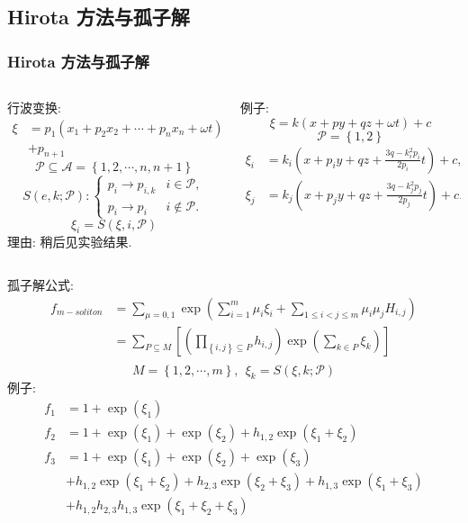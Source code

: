 \documentclass{beamer}
\newcommand{\sbrace}[1]{\left(#1\right)}
\newcommand{\mbrace}[1]{\left[#1\right]}
\newcommand{\bbrace}[1]{\left\{#1\right\}}
\newcommand{\ALLP}{\mathcal{A}}
\newcommand{\PS}{\mathcal{P}}
\begin{document}
\subsection{Hirota 方法与孤子解}
\begin{frame}
\frametitle{Hirota 方法与孤子解}
\begin{columns}
\footnotesize 
\begin{column}{0.5\textwidth}
行波变换:
\[
\begin{split}
    \xi&=p_1\sbrace{x_1+p_2x_2+\cdots+p_nx_n+\omega t} \\ 
    &+p_{n+1}
\end{split}
\]
\[
    \PS\subseteq  \ALLP=\bbrace{1,2,\cdots,n,n+1}
\]
\[
    S(e,k;\PS): \left\{\begin{array}{ll}
        p_i \rightarrow p_{i,k} & i \in \PS, \\ 
        p_i \rightarrow p_i & i \not\in \PS.
    \end{array}\right.
\]
\[
    \xi_i=S(\xi,i,\PS)
\]
理由: 稍后见实验结果.
\end{column}
\begin{column}{0.5\textwidth}
例子:
\[
    \xi=k(x+py+qz+\omega t)+c
\]
\[
    \PS=\bbrace{1,2}
\]
\[
\begin{split}
    \xi_i&=k_i\sbrace{x+p_iy+qz+\frac{3q-k_i^2p_i}{2p_i}t}+c, \\ 
    \xi_j&=k_j\sbrace{x+p_jy+qz+\frac{3q-k_j^2p_j}{2p_j}t}+c.
\end{split} 
\]
\end{column}
\end{columns}
\end{frame}

\begin{frame}
孤子解公式:
\[
\begin{split}
    f_{m-soliton}&=\sum_{\mu=0,1}\exp\sbrace{\sum_{i=1}^m{\mu_i \xi_i}+\sum_{1\le i<j\le m}{\mu_i\mu_jH_{i,j}}} \\ 
    &=\sum_{P\subseteq M}\mbrace{\sbrace{\prod_{\bbrace{i,j}\subseteq P}{h_{i,j}}}\exp\sbrace{\sum_{k\in P}{\xi_k}}} \\ 
\end{split}
\]
\[
    M=\bbrace{1,2,\cdots,m},~~\xi_k=S(\xi,k;\PS)
\]
例子:
\[
\begin{split}
    f_1&=1+\exp\sbrace{\xi_1} \\ 
    f_2&=1+\exp\sbrace{\xi_1}+\exp\sbrace{\xi_2}+h_{1,2}\exp\sbrace{\xi_1+\xi_2} \\ 
    f_3&=1+\exp(\xi_1)+\exp(\xi_2)+\exp(\xi_3)\\
       &+h_{1,2}\exp(\xi_1+\xi_2)+h_{2,3}\exp(\xi_2+\xi_3)+h_{1,3}\exp(\xi_1+\xi_3)\\
       &+h_{1,2}h_{2,3}h_{1,3}\exp(\xi_1+\xi_2+\xi_3)
\end{split}
\]
\end{frame}
\end{document}

